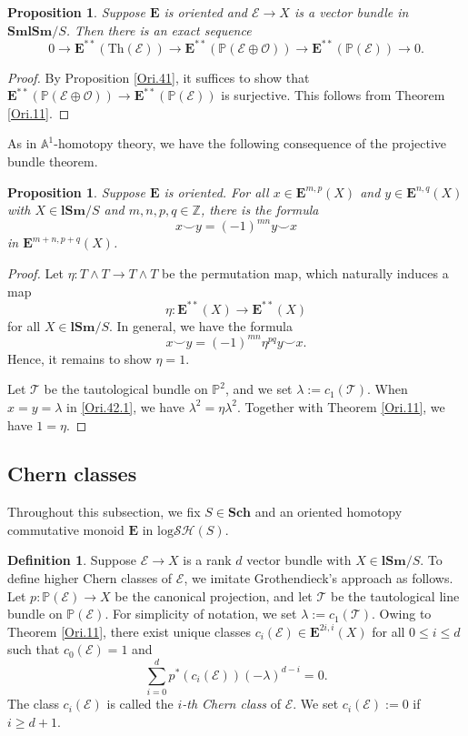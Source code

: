 \documentclass[11pt, a4paper]{amsart}
\newtheorem{prop}[thm]{Proposition}
\theoremstyle{definition}
\newtheorem{df}[thm]{Definition}
\numberwithin{equation}{subsection}
\newcommand{\Z}{\mathbb{Z}}
\renewcommand{\P}{\mathbb{P}}
\newcommand{\A}{\mathbb{A}}
\newcommand{\Sch}{\mathbf{Sch}}
\newcommand{\lSm}{\mathbf{lSm}}
\newcommand{\SmlSm}{\mathbf{SmlSm}}
\newcommand{\Thom}{\mathrm{Th}}
\newcommand{\cE}{\mathcal{E}}
\newcommand{\cO}{\mathcal{O}}
\newcommand{\cT}{\mathcal{T}}
\newcommand{\ringE}{\mathbf{E}}
\newcommand{\inflogSH}{\mathrm{log}\mathcal{SH}}
\begin{document}
\begin{prop}
\label{Ori.43}
Suppose $\ringE$ is oriented and $\cE\to X$ is a vector bundle in $\SmlSm/S$.
Then there is an exact sequence
\begin{equation}
\label{Ori.43.1}
0
\to
\ringE^{**}(\Thom(\cE))
\to
\ringE^{**}(\P(\cE\oplus \cO))
\to
\ringE^{**}(\P(\cE))
\to
0.
\end{equation}
\end{prop}
\begin{proof}
By Proposition \ref{Ori.41}, it suffices to show that $\ringE^{**}(\P(\cE\oplus \cO)) \to \ringE^{**}(\P(\cE))$ is surjective.
This follows from Theorem \ref{Ori.11}.
\end{proof}

As in $\A^1$-homotopy theory, we have the following consequence of the projective bundle theorem.

\begin{prop}
\label{Ori.42}
Suppose $\ringE$ is oriented.
For all $x\in \ringE^{m,p}(X)$ and $y\in \ringE^{n,q}(X)$ with $X\in \lSm/S$ and $m,n,p,q\in \Z$, there is the formula
\[
x\smile y
=
(-1)^{mn}
y \smile x
\]
in $\ringE^{m+n,p+q}(X)$.
\end{prop}
\begin{proof}
Let $\eta\colon T\wedge T\to T\wedge T$ be the permutation map, which naturally induces a map
\[
\eta\colon \ringE^{**}(X)\to \ringE^{**}(X)
\]
for all $X\in \lSm/S$.
In general, we have the formula
\begin{equation}
\label{Ori.42.1}
x\smile y
=
(-1)^{mn}\eta^{pq} y\smile x.
\end{equation}
Hence, it remains to show $\eta=1$.

Let $\cT$ be the tautological bundle on $\P^2$, and we set $\lambda:=c_1(\cT)$.
When $x=y=\lambda$ in \eqref{Ori.42.1}, we have $\lambda^2=\eta\lambda^2$.
Together with Theorem \ref{Ori.11}, we have $1=\eta$.
\end{proof}




\subsection{Chern classes}
Throughout this subsection, we fix $S\in \Sch$ and an oriented homotopy commutative monoid $\ringE$ in $\inflogSH(S)$.

\begin{df}
\label{Ori.13}
Suppose $\cE\to X$ is a rank $d$ vector bundle with $X\in \lSm/S$.
To define higher Chern classes of $\cE$, we imitate Grothendieck's approach as follows.
Let $p\colon \P(\cE)\to X$ be the canonical projection, 
and let $\cT$ be the tautological line bundle on $\P(\cE)$.
For simplicity of notation, we set $\lambda:=c_1(\cT)$.
Owing to Theorem \ref{Ori.11}, 
there exist unique classes $c_i(\cE)\in \ringE^{2i,i}(X)$ for all $0\leq i\leq d$ such that $c_0(\cE)=1$ and
\begin{equation}
\label{Ori.13.1}
\sum_{i=0}^d  p^* (c_i(\cE))(-\lambda)^{d-i}=0.
\end{equation}
The class $c_i(\cE)$ is called the \emph{$i$-th Chern class} \index[notation]{ci @ $c_i(\cE)$} 
of $\cE$.
We set $c_i(\cE):=0$ if $i\geq d+1$.
\end{df}
\end{document}
